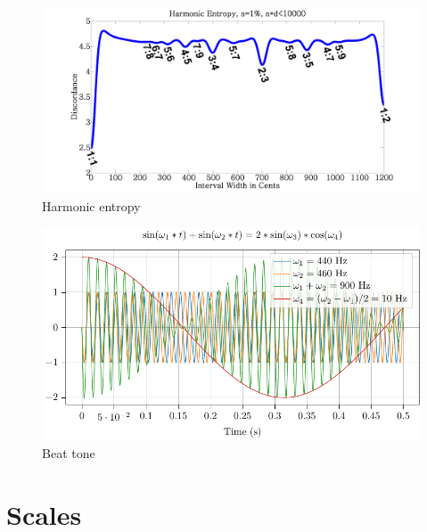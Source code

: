 \documentclass{article}
\begin{document}
\begin{figure}[h!]
	\centering
	\hspace*{0cm}
	\includegraphics[scale=0.03, trim= {0cm 0cm 0cm 0cm}, clip]{figures/1.intervalles/Harmonic_entropy.png}
	\caption{Harmonic entropy}
	\label{fig:harmonic_entro}
\end{figure}

\begin{figure}[h!]
	\centering
	\hspace*{0cm}
	\includegraphics[scale=0.5, trim= {0cm 0cm 0cm 0cm}, clip]{figures/1.intervalles/battement/main.pdf}
	\caption{Beat tone}
	\label{fig:battement}
\end{figure}


\clearpage
\section{Scales}
\end{document}
